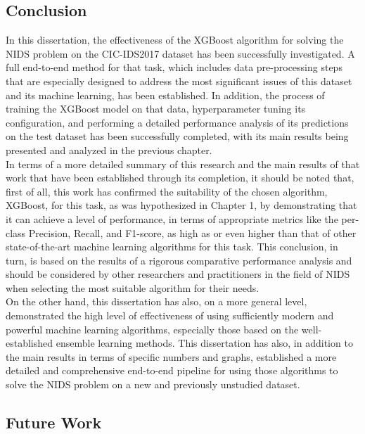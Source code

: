 \subsection{Conclusion} 

In this dissertation, the effectiveness of the XGBoost algorithm for solving the NIDS problem on the CIC-IDS2017 dataset has been successfully investigated. A full end-to-end method for that task, which includes data pre-processing steps that are especially designed to address the most significant issues of this dataset and its machine learning, has been established. In addition, the process of training the XGBoost model on that data, hyperparameter tuning its configuration, and performing a detailed performance analysis of its predictions on the test dataset has been successfully completed, with its main results being presented and analyzed in the previous chapter.\\

In terms of a more detailed summary of this research and the main results of that work that have been established through its completion, it should be noted that, first of all, this work has confirmed the suitability of the chosen algorithm, XGBoost, for this task, as was hypothesized in Chapter 1, by demonstrating that it can achieve a level of performance, in terms of appropriate metrics like the per-class Precision, Recall, and F1-score, as high as or even higher than that of other state-of-the-art machine learning algorithms for this task. This conclusion, in turn, is based on the results of a rigorous comparative performance analysis and should be considered by other researchers and practitioners in the field of NIDS when selecting the most suitable algorithm for their needs.\\

On the other hand, this dissertation has also, on a more general level, demonstrated the high level of effectiveness of using sufficiently modern and powerful machine learning algorithms, especially those based on the well-established ensemble learning methods. This dissertation has also, in addition to the main results in terms of specific numbers and graphs, established a more detailed and comprehensive end-to-end pipeline for using those algorithms to solve the NIDS problem on a new and previously unstudied dataset.



\subsection{Future Work} 

